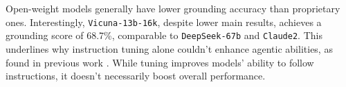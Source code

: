 Open-weight models generally have lower grounding accuracy than proprietary ones. Interestingly, \texttt{Vicuna-13b-16k}, despite lower main results, achieves a grounding score of 68.7\%, comparable to \texttt{DeepSeek-67b} and \texttt{Claude2}. This underlines why instruction tuning alone couldn't enhance agentic abilities, as found in previous work \citep{wang2023mint}. While tuning improves models' ability to follow instructions, it doesn't necessarily boost overall performance.










